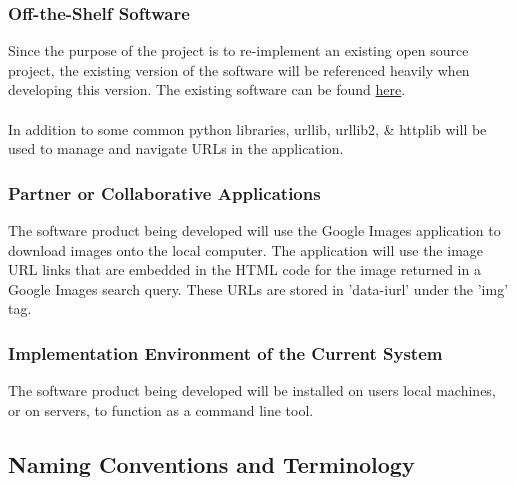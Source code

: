 \documentclass[12pt, titlepage]{article}
\begin{document}
\subsubsection{Off-the-Shelf Software}

Since the purpose of the project is to re-implement an existing open source project, the existing version of the software will be referenced heavily when developing this version. The existing software can be found \href{https://github.com/hardikvasa/google-images-download}{here}.
\\ \\
In addition to some common python libraries, urllib, urllib2, \& httplib will be used to manage and navigate URLs in the application.

\subsubsection{Partner or Collaborative Applications}

The software product being developed will use the Google Images application to download images onto the local computer. The application will use the image URL links that are embedded in the HTML code for the image returned in a Google Images search query. These URLs are stored in 'data-iurl' under the 'img' tag.

\subsubsection{Implementation Environment of the Current System}

The software product being developed will be installed on users local machines, or on servers, to function as a command line tool.


\subsection{Naming Conventions and Terminology}
\end{document}
